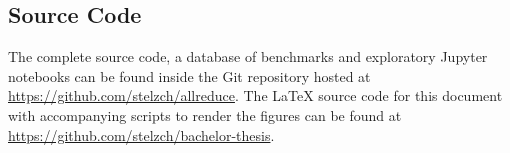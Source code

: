 \subsection{Source Code}
The complete source code, a database of benchmarks and exploratory Jupyter notebooks can be found inside the Git repository hosted at \url{https://github.com/stelzch/allreduce}.
The \LaTeX{} source code for this document with accompanying scripts to render the figures can be found at \url{https://github.com/stelzch/bachelor-thesis}.